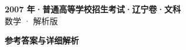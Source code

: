 \documentclass[zihao=-4, a4paper]{ctexart}
\begin{document}
\begin{center}
  {\Large\bfseries 2007 年·普通高等学校招生考试·辽宁卷·文科}\\[4pt]
  {\large 数学 · 解析版}
\end{center}
\medskip
{}

\clearpage
{}
\begin{center}{\Large\bfseries 参考答案与详细解析}\end{center}
\medskip

\end{document}

